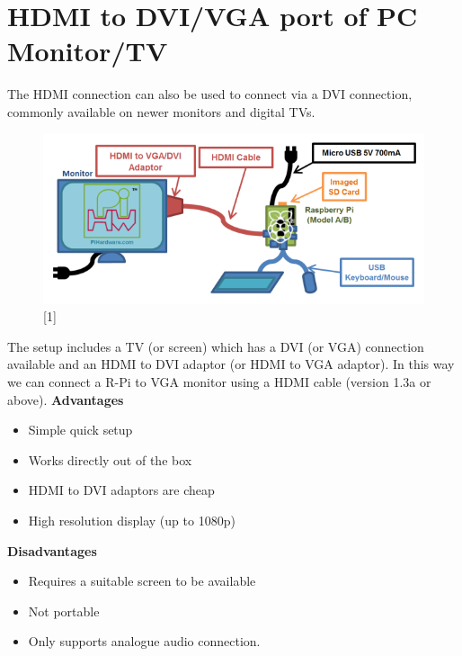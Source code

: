\documentclass[11pt,a4paper]{article}
\begin{document}
		\section{HDMI to DVI/VGA port of PC Monitor/TV}
		The HDMI connection can also be used to connect via a DVI connection, commonly available on newer monitors and digital TVs.
		\begin{figure}[h!]
			\includegraphics[scale=0.5]{pc.png}
			\centering
			\caption{[1]}
		\end{figure}
		
		The setup includes a TV (or screen) which has a DVI (or VGA) connection available and an HDMI to DVI adaptor (or HDMI to VGA adaptor). In this way we can connect a R-Pi to VGA monitor using a HDMI cable (version 1.3a or above).
		\textbf{Advantages}
		\begin{itemize}
			\item Simple quick setup
			\item Works directly out of the box
			\item HDMI to DVI adaptors are cheap
			\item High resolution display (up to 1080p)
		\end{itemize}
		
		\textbf{Disadvantages}
		\begin{itemize}
			\item Requires a suitable screen to be available 
			\item Not portable 
			\item Only supports analogue audio connection.
		\end{itemize}
		
		\newpage
\end{document}
